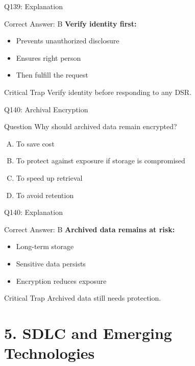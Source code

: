 \documentclass{beamer}
\begin{document}
	\begin{frame}{Q139: Explanation}
		\begin{block}{Correct Answer: B}
			\textbf{Verify identity first:}
			\begin{itemize}
				\item Prevents unauthorized disclosure
				\item Ensures right person
				\item Then fulfill the request
			\end{itemize}
		\end{block}
		\begin{alertblock}{Critical Trap}
			Verify identity before responding to any DSR.
		\end{alertblock}
	\end{frame}
	
	\begin{frame}{Q140: Archival Encryption}
		\begin{block}{Question}
			Why should archived data remain encrypted?
		\end{block}
		\begin{enumerate}[(A)]
			\item To save cost
			\item To protect against exposure if storage is compromised
			\item To speed up retrieval
			\item To avoid retention
		\end{enumerate}
	\end{frame}
	
	\begin{frame}{Q140: Explanation}
		\begin{block}{Correct Answer: B}
			\textbf{Archived data remains at risk:}
			\begin{itemize}
				\item Long-term storage
				\item Sensitive data persists
				\item Encryption reduces exposure
			\end{itemize}
		\end{block}
		\begin{alertblock}{Critical Trap}
			Archived data still needs protection.
		\end{alertblock}
	\end{frame}
	
	\section{5. SDLC and Emerging Technologies}
	
\end{document}
